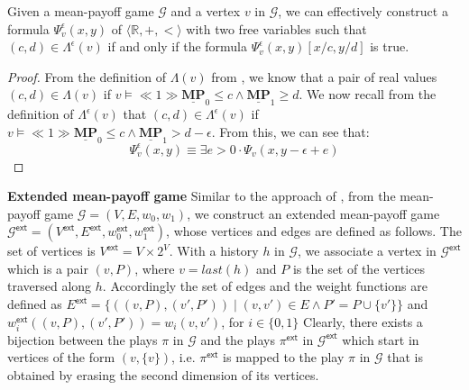 \begin{lemma}
\label{LemPsiEpsToThrOfReal}
 Given a mean-payoff game $\mathcal{G}$ and a vertex $v$ in $\mathcal{G}$, we can effectively  construct a formula $\Psi_v^{\epsilon}(x, y)$ of $\langle \mathbb{R}, +, < \rangle$ with two free variables such that $(c,d) \in \Lambda^{\epsilon}(v)$ if and only if the formula $\Psi_v^{\epsilon}(x, y)[x/c, y/d]$ is true.
\end{lemma}
\begin{proof}
From the definition of $\Lambda(v)$ from \cite{FGR20}, we know that a pair of real values $(c,d) \in \Lambda(v)$ if $v \models \ll 1 \gg \underline{\mathbf{MP}}_0 \leqslant c \land \underline{\mathbf{MP}}_1 \geqslant d$.
We now recall from the definition of $\Lambda^{\epsilon}(v)$ that $(c,d) \in \Lambda^{\epsilon}(v)$ if $v \models \ll 1 \gg \underline{\mathbf{MP}}_0 \leqslant c \land \underline{\mathbf{MP}}_1 > d-\epsilon$.
From this, we can see that:
\begin{equation*}
    \Psi_v^{\epsilon}(x, y) \equiv \exists e > 0 \cdot \Psi_v(x, y - \epsilon + e)
\end{equation*}
\end{proof}

\textbf{Extended mean-payoff game} Similar to the approach of \cite{FGR20}, from the mean-payoff game $\mathcal{G} = (V, E, w_0, w_1)$,  we construct an extended mean-payoff game $\mathcal{G}^{\mathsf{ext}} = (V^{\mathsf{ext}}, E^{\mathsf{ext}}, w_0^{\mathsf{ext}}, w_1^{\mathsf{ext}})$, whose vertices and edges are defined as follows. The set of vertices is $V^{\mathsf{ext}} = V \times 2^V$. With a history $h$ in $\mathcal{G}$, we associate a vertex in $\mathcal{G}^{\mathsf{ext}}$ which is a pair $(v, P)$, where $v = last(h)$ and $P$ is the set of the vertices traversed along $h$. Accordingly the set of edges and the weight functions are defined as $E^{\mathsf{ext}} = \{((v,P),(v', P')) \mid (v,v') \in E \land P' = P \cup \{v'\}\}$ and $w_i^{\mathsf{ext}}((v,P),(v', P')) = w_i(v, v')$, for $i \in \{0,1\}$ Clearly, there exists a bijection between the plays $\pi$ in $\mathcal{G}$ and the plays $\pi^{\mathsf{ext}}$ in $\mathcal{G}^{\mathsf{ext}}$ which start in vertices of the form $(v, \{v\})$, i.e. $\pi^{\mathsf{ext}}$ is mapped to the play $\pi$ in $\mathcal{G}$ that is obtained by erasing the second dimension of its vertices.


